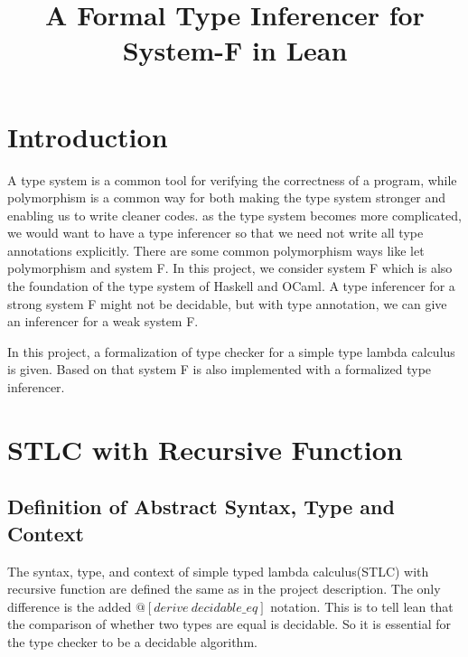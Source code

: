 \documentclass[conference]{IEEEtran}
\begin{document}
\title{A Formal Type Inferencer for System-F in Lean}
\author{
}

\maketitle

\begin{abstract}

\end{abstract}
\section{Introduction}
A type system is a common tool for verifying the correctness of a program, while polymorphism is a common way
for both making the type system stronger and enabling us to write cleaner codes. as the type system becomes more
complicated, we would want to have a type inferencer so that we need not write all type annotations explicitly.
There are some common polymorphism ways like let polymorphism and system F. In this project, we consider system F
which is also the foundation of the type system of Haskell and OCaml. A type inferencer for a strong system F might
not be decidable, but with type annotation, we can give an inferencer for a weak system F.

In this project, a formalization of type checker for a simple type lambda calculus is given. Based on that
system F is also implemented with a formalized type inferencer.

\section{STLC with Recursive Function}
\subsection{Definition of Abstract Syntax, Type and Context}
The syntax, type, and context of simple typed lambda calculus(STLC) with recursive function are defined
the same as in the project description. The only difference is the added $@[derive\ decidable\_eq]$
notation. This is to tell lean that the comparison of whether two types are equal is decidable.
So it is essential for the type checker to be a decidable algorithm.
\end{document}
